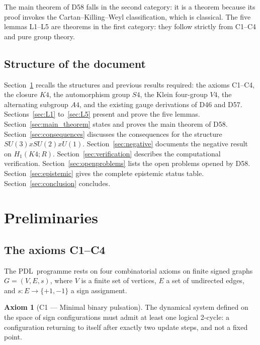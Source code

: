 \documentclass[11pt,a4paper]{article}
\def\Sfour{S4}%
\def\Vfour{V4}%
\def\Afour{A4}%
\def\SUthree{SU(3)}%
\def\SUtwo{SU(2)}%
\def\Uone{U(1)}%
\def\Kfour{K4}%
\def\PDL{PDL}%
\def\times{x}%
\def\RR{R}%
\def\mathbb#1{#1}%
\def\mathrm#1{#1}%
\def\textsc#1{#1}%
\theoremstyle{plain}
\theoremstyle{definition}
\newtheorem{axiom}{Axiom}
\theoremstyle{remark}
\newcommand{\PDL}{\textsc{PDL}}
\newcommand{\Kfour}{K_4}
\newcommand{\Sfour}{S_4}
\newcommand{\Afour}{A_4}
\newcommand{\Vfour}{V_4}
\newcommand{\SUthree}{\mathrm{SU}(3)}
\newcommand{\SUtwo}{\mathrm{SU}(2)}
\newcommand{\Uone}{\mathrm{U}(1)}
\newcommand{\RR}{\mathbb{R}}
\begin{document}
The main theorem of D58 falls in the second category: it is a theorem because its proof invokes the Cartan--Killing--Weyl classification, which is classical. The five lemmas L1--L5 are theorems in the first category: they follow strictly from C1--C4 and pure group theory.

\subsection{Structure of the document}
\label{subsec:structure}

Section~\ref{sec:preliminaries} recalls the structures and previous results required: the axioms C1--C4, the closure $\Kfour$, the automorphism group $\Sfour$, the Klein four-group $\Vfour$, the alternating subgroup $\Afour$, and the existing gauge derivations of D46 and D57. Sections~\ref{sec:L1} to~\ref{sec:L5} present and prove the five lemmas. Section~\ref{sec:main_theorem} states and proves the main theorem of D58. Section~\ref{sec:consequences} discusses the consequences for the structure $\SUthree \times \SUtwo \times \Uone$. Section~\ref{sec:negative} documents the negative result on $H_1(\Kfour;\RR)$. Section~\ref{sec:verification} describes the computational verification. Section~\ref{sec:openproblems} lists the open problems opened by D58. Section~\ref{sec:epistemic} gives the complete epistemic status table. Section~\ref{sec:conclusion} concludes.

\section{Preliminaries}
\label{sec:preliminaries}

\subsection{The axioms C1--C4}
\label{subsec:axioms}

The \PDL\ programme rests on four combinatorial axioms on finite signed graphs $G = (V, E, s)$, where $V$ is a finite set of vertices, $E$ a set of undirected edges, and $s\colon E \to \{+1, -1\}$ a sign assignment.

\begin{axiom}[C1 --- Minimal binary pulsation]
The dynamical system defined on the space of sign configurations must admit at least one logical 2-cycle: a configuration returning to itself after exactly two update steps, and not a fixed point.
\end{axiom}
\end{document}
